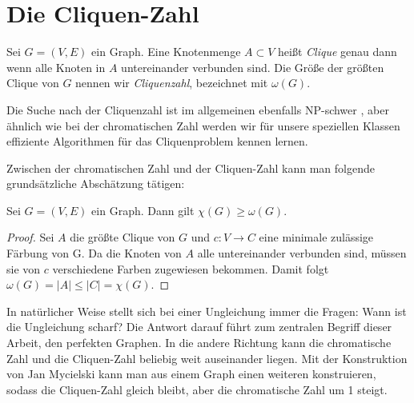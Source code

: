 \documentclass[../main.tex]{subfiles}
\begin{document}
\section{Die Cliquen-Zahl}

\begin{definition}
    Sei $G = (V, E)$ ein Graph. Eine Knotenmenge $A \subset V$ heißt \emph{Clique} genau dann wenn alle Knoten in $A$ untereinander verbunden sind. Die Größe der größten Clique von $G$ nennen wir \emph{Cliquenzahl}, bezeichnet mit $\omega(G)$.
\end{definition}

Die Suche nach der Cliquenzahl ist im allgemeinen ebenfalls NP-schwer \cite{Karp1972}, aber ähnlich wie bei der chromatischen Zahl werden wir für unsere speziellen Klassen effiziente Algorithmen für das Cliquenproblem kennen lernen.

Zwischen der chromatischen Zahl und der Cliquen-Zahl kann man folgende grundsätzliche Abschätzung tätigen:

\begin{satz}\label{thm:ineq}
    Sei $G = (V, E)$ ein Graph. Dann gilt $\chi(G) \geq \omega(G)$.
\end{satz}
\begin{proof}
    Sei $A$ die größte Clique von $G$ und $c: V \to C$ eine minimale zulässige Färbung von G. Da die Knoten von $A$ alle untereinander verbunden sind, müssen sie von $c$ verschiedene Farben zugewiesen bekommen. Damit folgt $\omega(G) = |A| \leq |C| = \chi(G)$.
\end{proof}

In natürlicher Weise stellt sich bei einer Ungleichung immer die Fragen: Wann ist die Ungleichung scharf? Die Antwort darauf führt zum zentralen Begriff dieser Arbeit, den perfekten Graphen. In die andere Richtung kann die chromatische Zahl und die Cliquen-Zahl beliebig weit auseinander liegen. Mit der Konstruktion von Jan Mycielski \cite{Mycielski1955} kann man aus einem Graph einen weiteren konstruieren, sodass die Cliquen-Zahl gleich bleibt, aber die chromatische Zahl um 1 steigt.
\end{document}
